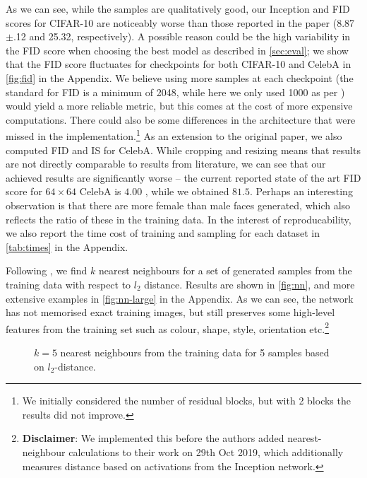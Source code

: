 As we can see, while the samples are qualitatively good, our Inception and FID scores for CIFAR-10 are noticeably worse than those reported in the paper (8.87$\pm$.12 and 25.32, respectively). A possible reason could be the high variability in the FID score when choosing the best model as described in \autoref{sec:eval}; we show that the FID score fluctuates for checkpoints for both CIFAR-10 and CelebA in \autoref{fig:fid} in the Appendix. We believe using more samples at each checkpoint (the standard for FID is a minimum of 2048, while here we only used 1000 as per \cite{ncsn-paper}) would yield a more reliable metric, but this comes at the cost of more expensive computations. There could also be some differences in the architecture that were missed in the implementation.\footnote{We initially considered the number of residual blocks, but with 2 blocks the results did not improve.} As an extension to the original paper, we also computed FID and IS for CelebA. While cropping and resizing means that results are not directly comparable to results from literature, we can see that our achieved results are significantly worse -- the current reported state of the art FID score for $64 \times 64$ CelebA is $4.00$ \cite{DBLP:journals/corr/abs-1904-00284}, while we obtained $81.5$. Perhaps an interesting observation is that there are more female than male faces generated, which also reflects the ratio of these in the training data. In the interest of reproducability, we also report the time cost of training and sampling for each dataset in \autoref{tab:times} in the Appendix.

Following \cite{ncsn-paper}, we find $k$ nearest neighbours for a set of generated samples from the training data with respect to $l_2$ distance. Results are shown in \autoref{fig:nn}, and more extensive examples in \autoref{fig:nn-large} in the Appendix. As we can see, the network has not memorised exact training images, but still preserves some high-level features from the training set such as colour, shape, style, orientation etc.\footnote{\textbf{Disclaimer}: We implemented this before the authors added nearest-neighbour calculations to their work on 29th Oct 2019, which additionally measures distance based on activations from the Inception network.}\vspace{-4mm}

\begin{figure}[h!]
  \centering
     \hspace{3mm}
     \hspace{3mm}
     \caption{$k=5$ nearest neighbours from the training data for 5 samples based on $l_2$-distance.}
     \label{fig:nn}
\end{figure}

